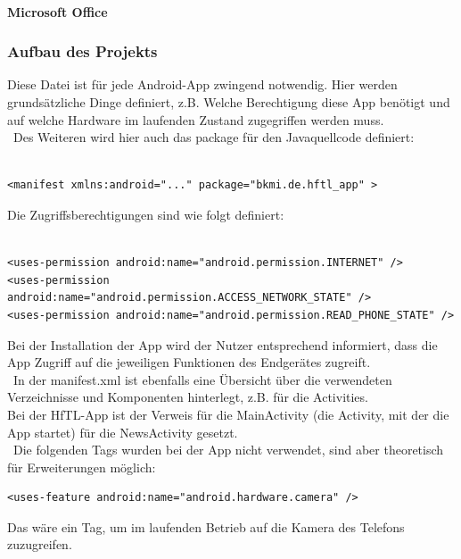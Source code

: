 \paragraph{Microsoft Office}

\subsubsection{Aufbau des Projekts}
Diese Datei ist für jede Android-App zwingend notwendig. Hier werden grundsätzliche Dinge definiert, z.B. Welche Berechtigung diese App benötigt und auf welche Hardware im laufenden Zustand zugegriffen werden muss.
\\\
Des Weiteren wird hier auch das package für den Javaquellcode definiert:\\\
\lstset{language=XML}
\begin{lstlisting}[caption={AndroidManifest.XML},label=package, frame=single]
<manifest xmlns:android="..." package="bkmi.de.hftl_app" >
\end{lstlisting}
Die Zugriffsberechtigungen sind wie folgt definiert:\\\

\begin{lstlisting}[caption={AndroidManifest.XML},label=permissions, frame=single]
<uses-permission android:name="android.permission.INTERNET" />
<uses-permission android:name="android.permission.ACCESS_NETWORK_STATE" />
<uses-permission android:name="android.permission.READ_PHONE_STATE" />
\end{lstlisting}
Bei der Installation der App wird der Nutzer entsprechend informiert, dass die App Zugriff auf die jeweiligen Funktionen des Endgerätes zugreift.
 \\\
In der manifest.xml ist ebenfalls eine Übersicht über die verwendeten Verzeichnisse und Komponenten hinterlegt, z.B. für die Activities.\\
Bei der HfTL-App ist der Verweis für die MainActivity (die Activity, mit der die App startet) für die NewsActivity gesetzt.
 \\\ 
Die folgenden Tags wurden bei der App nicht verwendet, sind aber theoretisch für Erweiterungen möglich:
\begin{lstlisting}[caption={Zugriffsbeispiel},label=perm-examble, frame=single]
<uses-feature android:name="android.hardware.camera" />
\end{lstlisting}
Das wäre ein Tag, um im laufenden Betrieb auf die Kamera des Telefons zuzugreifen.

